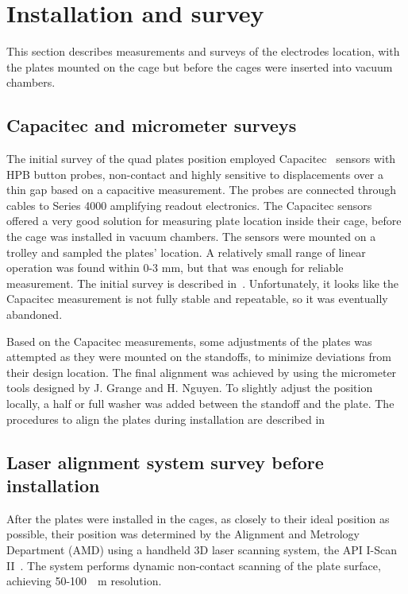\section{\label{sec:InstallationSurvey} Installation and survey}
\medskip

This section describes measurements and surveys of the electrodes location, with the plates mounted on the cage but before the cages were inserted into vacuum chambers.

\subsection{\label{Capacitec} Capacitec and micrometer surveys}

The initial survey of the quad plates position employed Capacitec~\cite{Capacitec} sensors with HPB button probes, non-contact and highly sensitive to displacements over a thin gap based on a capacitive measurement. 
The probes are connected through cables to Series 4000 amplifying readout electronics. 
The Capacitec sensors offered a very good solution for measuring plate location inside their cage, before the cage was installed in vacuum chambers. 
The sensors were mounted on a trolley and sampled the plates' location.
A relatively small range of linear operation was found within 0-3 mm, but that was enough for reliable measurement. 
The initial survey is described in~\cite{Wanwei:doc3709}.
Unfortunately, it looks like the Capacitec measurement is not fully stable and repeatable, so it was eventually abandoned.

Based on the Capacitec measurements, some adjustments of the plates was attempted as they were mounted on the standoffs, to minimize deviations from their design location.
The final alignment was achieved by using the micrometer tools designed by J. Grange and H. Nguyen. To slightly adjust the position locally, a half or full washer was added between the standoff and the plate.
The procedures to align the plates during installation are described in~\cite{Wanwei:doc8036}



\subsection{\label{sec:LaserScan} Laser alignment system survey before installation}

After the plates were installed in the cages, as closely to their ideal position as possible, their position was determined by the Alignment and Metrology Department (AMD) using a handheld 3D laser scanning system, the API I-Scan II~\cite{API}.
The system performs dynamic non-contact scanning of the plate surface, achieving 50-\SI{100}{{\micro}m} resolution.

